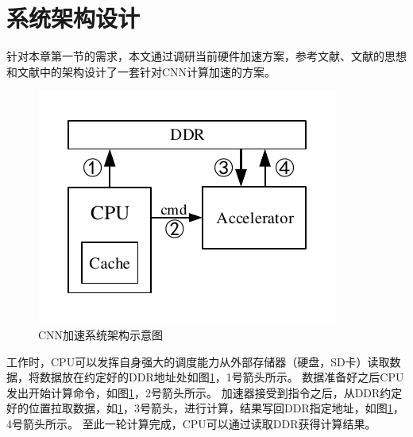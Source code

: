 \section{系统架构设计}
    针对本章第一节的需求，本文通过调研当前硬件加速方案，参考文献\cite{chen2017eyeriss}、文献\cite{chen2016eyeriss}的思想和文献\cite{sun2018high}中的架构设计了一套针对CNN计算加速的方案。
    \begin{figure}[h]
        \centering
        \includegraphics{../pdf/system.pdf}
        \caption{CNN加速系统架构示意图}
        \label{sys}
    \end{figure}
    工作时，CPU可以发挥自身强大的调度能力从外部存储器（硬盘，SD卡）读取数据，将数据放在约定好的DDR地址处如图\ref{sys}，1号箭头所示。
    数据准备好之后CPU发出开始计算命令，如图\ref{sys}，2号箭头所示。
    加速器接受到指令之后，从DDR约定好的位置拉取数据，如\ref{sys}，3号箭头，进行计算，结果写回DDR指定地址，如图\ref{sys}，4号箭头所示。
    至此一轮计算完成，CPU可以通过读取DDR获得计算结果。



